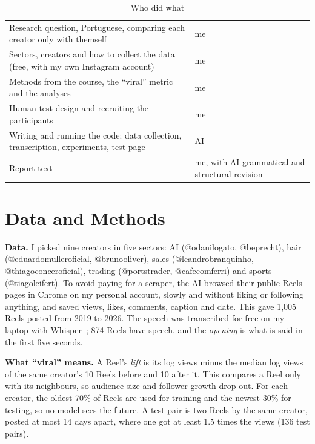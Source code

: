 \documentclass[conference]{IEEEtran}
\begin{document}
\begin{table}[htbp]
\caption{Who did what}
\begin{center}
\footnotesize
\begin{tabular}{>{\raggedright\arraybackslash}p{}>{\raggedright\arraybackslash}p{}}
\hline
Research question, Portuguese, comparing each creator only with themself & me \\
Sectors, creators and how to collect the data (free, with my own Instagram account) & me \\
Methods from the course, the ``viral'' metric and the analyses & me \\
Human test design and recruiting the participants & me \\
Writing and running the code: data collection, transcription, experiments, test page & AI \\
Report text & me, with AI grammatical and structural revision \\
\hline
\end{tabular}
\label{tab:who}
\end{center}
\end{table}

\section{Data and Methods}
\textbf{Data.} I picked nine creators in five sectors: AI (@odanilogato, @beprecht), hair (@eduardomulleroficial, @brunooliver), sales (@leandrobranquinho, @thiagoconceroficial), trading (@portstrader, @cafecomferri) and sports (@tiagoleifert).
To avoid paying for a scraper, the AI browsed their public Reels pages in Chrome on my personal account, slowly and without liking or following anything, and saved views, likes, comments, caption and date.
This gave 1,005 Reels posted from 2019 to 2026.
The speech was transcribed for free on my laptop with Whisper~\cite{whisper}; 874 Reels have speech, and the \emph{opening} is what is said in the first five seconds.

\textbf{What ``viral'' means.} A Reel's \emph{lift} is its log views minus the median log views of the same creator's 10 Reels before and 10 after it.
This compares a Reel only with its neighbours, so audience size and follower growth drop out.
For each creator, the oldest 70\% of Reels are used for training and the newest 30\% for testing, so no model sees the future.
A test pair is two Reels by the same creator, posted at most 14 days apart, where one got at least 1.5 times the views (136 test pairs).
\end{document}
